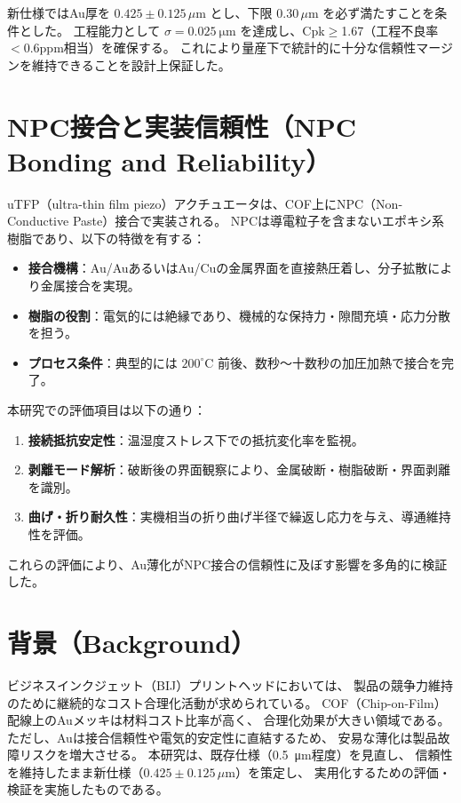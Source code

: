 \documentclass[conference]{IEEEtran}
\begin{document}
新仕様ではAu厚を $0.425 \pm 0.125\,\mu$m とし、下限 $0.30\,\mu$m を必ず満たすことを条件とした。
工程能力として $\sigma=\SI{0.025}{\micro\meter}$ を達成し、Cpk$\geq$1.67（工程不良率$<0.6$ppm相当）を確保する。
これにより量産下で統計的に十分な信頼性マージンを維持できることを設計上保証した。

\section{NPC接合と実装信頼性（NPC Bonding and Reliability）}
uTFP（ultra-thin film piezo）アクチュエータは、COF上にNPC（Non-Conductive Paste）接合で実装される。
NPCは導電粒子を含まないエポキシ系樹脂であり、以下の特徴を有する：
\begin{itemize}
  \item \textbf{接合機構}：Au/AuあるいはAu/Cuの金属界面を直接熱圧着し、分子拡散により金属接合を実現。
  \item \textbf{樹脂の役割}：電気的には絶縁であり、機械的な保持力・隙間充填・応力分散を担う。
  \item \textbf{プロセス条件}：典型的には $200^\circ\mathrm{C}$ 前後、数秒〜十数秒の加圧加熱で接合を完了。
\end{itemize}

本研究での評価項目は以下の通り：
\begin{enumerate}
  \item \textbf{接続抵抗安定性}：温湿度ストレス下での抵抗変化率を監視。
  \item \textbf{剥離モード解析}：破断後の界面観察により、金属破断・樹脂破断・界面剥離を識別。
  \item \textbf{曲げ・折り耐久性}：実機相当の折り曲げ半径で繰返し応力を与え、導通維持性を評価。
\end{enumerate}

これらの評価により、Au薄化がNPC接合の信頼性に及ぼす影響を多角的に検証した。

\section{背景（Background）}
ビジネスインクジェット（BIJ）プリントヘッドにおいては、
製品の競争力維持のために継続的なコスト合理化活動が求められている。
COF（Chip-on-Film）配線上のAuメッキは材料コスト比率が高く、
合理化効果が大きい領域である。
ただし、Auは接合信頼性や電気的安定性に直結するため、
安易な薄化は製品故障リスクを増大させる。
本研究は、既存仕様（\SI{0.5}{\micro\meter}程度）を見直し、
信頼性を維持したまま新仕様（$0.425 \pm 0.125\,\mu$m）を策定し、
実用化するための評価・検証を実施したものである。
\end{document}
